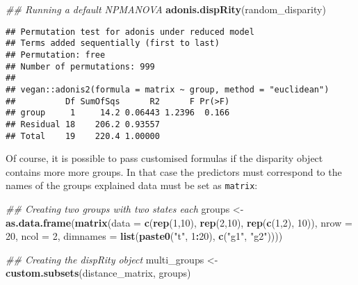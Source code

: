\documentclass[
]{book}
\newenvironment{Shaded}{\begin{snugshade}}{\end{snugshade}}
\newcommand{\CommentTok}[1]{\textcolor[rgb]{0.56,0.35,0.01}{\textit{#1}}}
\newcommand{\DataTypeTok}[1]{\textcolor[rgb]{0.13,0.29,0.53}{#1}}
\newcommand{\DecValTok}[1]{\textcolor[rgb]{0.00,0.00,0.81}{#1}}
\newcommand{\KeywordTok}[1]{\textcolor[rgb]{0.13,0.29,0.53}{\textbf{#1}}}
\newcommand{\NormalTok}[1]{#1}
\newcommand{\OperatorTok}[1]{\textcolor[rgb]{0.81,0.36,0.00}{\textbf{#1}}}
\newcommand{\StringTok}[1]{\textcolor[rgb]{0.31,0.60,0.02}{#1}}
\begin{document}
\begin{Shaded}
\begin{Highlighting}[]
\CommentTok{\#\# Running a default NPMANOVA}
\KeywordTok{adonis.dispRity}\NormalTok{(random\_disparity)}
\end{Highlighting}
\end{Shaded}

\begin{verbatim}
## Permutation test for adonis under reduced model
## Terms added sequentially (first to last)
## Permutation: free
## Number of permutations: 999
## 
## vegan::adonis2(formula = matrix ~ group, method = "euclidean")
##          Df SumOfSqs      R2      F Pr(>F)
## group     1     14.2 0.06443 1.2396  0.166
## Residual 18    206.2 0.93557              
## Total    19    220.4 1.00000
\end{verbatim}

Of course, it is possible to pass customised formulas if the disparity object contains more more groups.
In that case the predictors must correspond to the names of the groups explained data must be set as \texttt{matrix}:

\begin{Shaded}
\begin{Highlighting}[]
\CommentTok{\#\# Creating two groups with two states each}
\NormalTok{groups \textless{}{-}}\StringTok{ }\KeywordTok{as.data.frame}\NormalTok{(}\KeywordTok{matrix}\NormalTok{(}\DataTypeTok{data =} \KeywordTok{c}\NormalTok{(}\KeywordTok{rep}\NormalTok{(}\DecValTok{1}\NormalTok{,}\DecValTok{10}\NormalTok{),}
                                        \KeywordTok{rep}\NormalTok{(}\DecValTok{2}\NormalTok{,}\DecValTok{10}\NormalTok{),}
                                        \KeywordTok{rep}\NormalTok{(}\KeywordTok{c}\NormalTok{(}\DecValTok{1}\NormalTok{,}\DecValTok{2}\NormalTok{), }\DecValTok{10}\NormalTok{)),}
                        \DataTypeTok{nrow =} \DecValTok{20}\NormalTok{, }\DataTypeTok{ncol =} \DecValTok{2}\NormalTok{,}
                        \DataTypeTok{dimnames =} \KeywordTok{list}\NormalTok{(}\KeywordTok{paste0}\NormalTok{(}\StringTok{"t"}\NormalTok{, }\DecValTok{1}\OperatorTok{:}\DecValTok{20}\NormalTok{),}
                                        \KeywordTok{c}\NormalTok{(}\StringTok{"g1"}\NormalTok{, }\StringTok{"g2"}\NormalTok{))))}

\CommentTok{\#\# Creating the dispRity object}
\NormalTok{multi\_groups \textless{}{-}}\StringTok{ }\KeywordTok{custom.subsets}\NormalTok{(distance\_matrix, groups)}
\end{Highlighting}
\end{Shaded}
\end{document}
